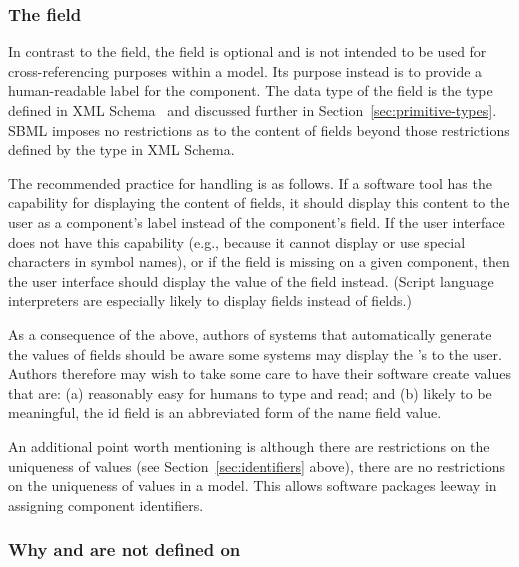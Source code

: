 \subsubsection{The  field}
\label{sec:name}

In contrast to the  field, the  field is
optional and is not intended to be used for cross-referencing
purposes within a model.  Its purpose instead is to provide a
human-readable label for the component.  The data type of the
 field is the type  defined in XML
Schema~\citep{biron:2000,thompson:2000} and discussed further in
Section~\ref{sec:primitive-types}.  SBML imposes no restrictions
as to the content of  fields beyond those restrictions
defined by the  type in XML Schema.

The recommended practice for handling  is as follows.
If a software tool has the capability for displaying the content
of  fields, it should display this content to the user
as a component's label instead of the component's 
field.  If the user interface does not have this capability (e.g.,
because it cannot display or use special characters in symbol
names), or if the  field is missing on a given
component, then the user interface should display the value of the
 field instead.  (Script language interpreters are
especially likely to display  fields instead of
 fields.)

As a consequence of the above, authors of systems that
automatically generate the values of  fields should be
aware some systems may display the 's to the user.
Authors therefore may wish to take some care to have their
software create  values that are: (a) reasonably easy
for humans to type and read; and (b) likely to be meaningful, \eg
the id field is an abbreviated form of the name field value.

An additional point worth mentioning is although there are
restrictions on the uniqueness of  values (see
Section~\ref{sec:identifiers} above), there are no restrictions on
the uniqueness of  values in a model.  This allows
software packages leeway in assigning component identifiers.


\subsubsection{Why  and  are not defined on }
\label{sec:why-not-on-sbase}

